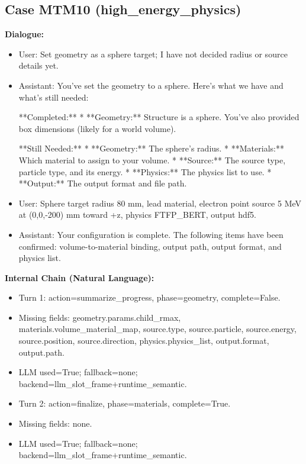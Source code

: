 \documentclass[11pt]{ctexart}
\begin{document}
\subsection{Case MTM10 (high\_energy\_physics)}
\textbf{Dialogue:}
\begin{itemize}
\item User: Set geometry as a sphere target; I have not decided radius or source details yet.
\item Assistant: You've set the geometry to a sphere. Here's what we have and what's still needed:

**Completed:**
*   **Geometry:** Structure is a sphere. You've also provided box dimensions (likely for a world volume).

**Still Needed:**
*   **Geometry:** The sphere's radius.
*   **Materials:** Which material to assign to your volume.
*   **Source:** The source type, particle type, and its energy.
*   **Physics:** The physics list to use.
*   **Output:** The output format and file path.
\item User: Sphere target radius 80 mm, lead material, electron point source 5 MeV at (0,0,-200) mm toward +z, physics FTFP\_BERT, output hdf5.
\item Assistant: Your configuration is complete. The following items have been confirmed: volume-to-material binding, output path, output format, and physics list.
\end{itemize}
\textbf{Internal Chain (Natural Language):}
\begin{itemize}
\item Turn 1: action=summarize\_progress, phase=geometry, complete=False.
\item Missing fields: geometry.params.child\_rmax, materials.volume\_material\_map, source.type, source.particle, source.energy, source.position, source.direction, physics.physics\_list, output.format, output.path.
\item LLM used=True; fallback=none; backend=llm\_slot\_frame+runtime\_semantic.
\item Turn 2: action=finalize, phase=materials, complete=True.
\item Missing fields: none.
\item LLM used=True; fallback=none; backend=llm\_slot\_frame+runtime\_semantic.
\end{itemize}
\end{document}
